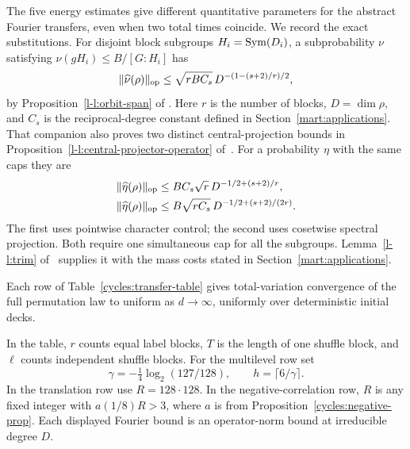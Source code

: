 The five energy estimates give different quantitative parameters for the
abstract Fourier transfers, even when two total times coincide. We record the exact
substitutions. For disjoint block subgroups $H_i=\operatorname{Sym}(D_i)$, a
subprobability $\nu$ satisfying $\nu(gH_i)\le B/[G:H_i]$ has
\begin{equation}\label{cycles:orbit-bound}
 \|\widehat\nu(\rho)\|_{\mathrm{op}}
 \le\sqrt{rBC_s}\,D^{-(1-(s+2)/r)/2},
\end{equation}
by Proposition~\ref*{l-l:orbit-span} of \cite{partialFourier}. Here $r$ is the
number of blocks, $D=\dim\rho$, and $C_s$ is the reciprocal-degree
constant defined in Section~\ref{mart:applications}. That companion
also proves two distinct central-projection bounds in
Proposition~\ref*{l-l:central-projector-operator} of~\cite{partialFourier}. For a probability
$\eta$ with the same caps they are
\begin{align}
 \|\widehat\eta(\rho)\|_{\mathrm{op}}
 &\le BC_s\sqrt r\,D^{-1/2+(s+2)/r},\label{cycles:projector-op-one}\\
 \|\widehat\eta(\rho)\|_{\mathrm{op}}
 &\le B\sqrt{rC_s}\,D^{-1/2+(s+2)/(2r)}.\label{cycles:projector-op-two}
\end{align}
The first uses pointwise character control; the second uses cosetwise
spectral projection. Both require one simultaneous cap for all the
subgroups. Lemma~\ref*{l-l:trim} of~\cite{partialFourier} supplies it with the mass costs stated
in Section~\ref{mart:applications}.

\begin{proposition}
\label{cycles:two-sweep-bounds}
Each row of Table~\ref{cycles:transfer-table} gives total-variation
convergence of the full permutation law to uniform as $d\to\infty$,
uniformly over deterministic initial decks.
\end{proposition}

In the table, $r$ counts equal label blocks, $T$ is the length of one
shuffle block, and $\ell$ counts independent shuffle blocks. For the
multilevel row set
\[
 \gamma=-\tfrac14\log_2(127/128),\qquad h=\lceil6/\gamma\rceil.
\]
In the translation row use $R=128\cdot128$. In the negative-correlation
row, $R$ is any fixed integer with $a(1/8)R>3$, where $a$ is from
Proposition~\ref{cycles:negative-prop}. Each displayed Fourier bound is
an operator-norm bound at irreducible degree $D$.

